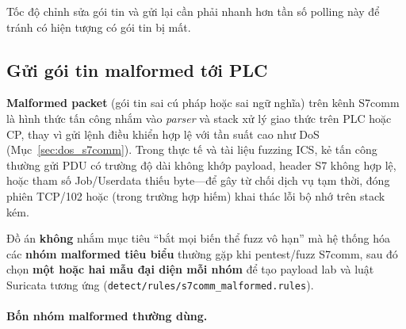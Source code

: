 \documentclass[../main.tex]{subfiles}
\begin{document}
Tốc độ chỉnh sửa gói tin và gửi lại cần phải nhanh hơn tần số polling này để tránh có hiện tượng có gói tin bị mất.

\setcounter{subsubsection}{0}

\subsection{Gửi gói tin malformed tới PLC}
\label{sec:malformed_plc}

\textbf{Malformed packet} (gói tin sai cú pháp hoặc sai ngữ nghĩa) trên kênh S7comm là hình thức tấn công nhắm vào \emph{parser} và stack xử lý giao thức trên PLC hoặc CP, thay vì gửi lệnh điều khiển hợp lệ với tần suất cao như DoS (Mục~\ref{sec:dos_s7comm}). Trong thực tế và tài liệu fuzzing ICS, kẻ tấn công thường gửi PDU có trường độ dài không khớp payload, header S7 không hợp lệ, hoặc tham số Job/Userdata thiếu byte---để gây từ chối dịch vụ tạm thời, đóng phiên TCP/102 hoặc (trong trường hợp hiếm) khai thác lỗi bộ nhớ trên stack kém.

Đồ án \textbf{không} nhắm mục tiêu ``bắt mọi biến thể fuzz vô hạn'' mà hệ thống hóa các \textbf{nhóm malformed tiêu biểu} thường gặp khi pentest/fuzz S7comm, sau đó chọn \textbf{một hoặc hai mẫu đại diện mỗi nhóm} để tạo payload lab và luật Suricata tương ứng (\texttt{detect/rules/s7comm\_malformed.rules}).

\paragraph{Bốn nhóm malformed thường dùng.}
\end{document}
